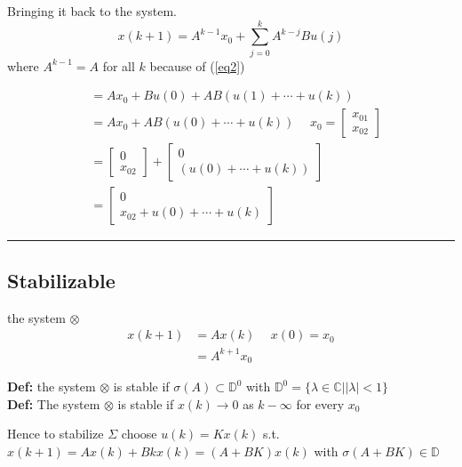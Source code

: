 \documentclass[a4paper]{article}
\begin{document}
Bringing it back to the system.
\begin{equation}
x(k+1) = A^{k-1} x_0 + \sum_{j=0}^{k}{A^{k-j} B u(j)} 
\end{equation}
where $ A^{k-1} = A$ for all $ k $ because of (\ref{eq2}) 


\begin{align}
 &= A x_0 + B u(0) + A B(u(1) + \cdots + u(k)) \\
 &= A x_0 +  A B(u(0) + \cdots + u(k)) \hspace{15pt} x_0 = \begin{bmatrix}
 x_{01} \\
 x_{02}
 \end{bmatrix}  \\
 &= \begin{bmatrix}
 0 \\
 x_{02}
 \end{bmatrix} + \begin{bmatrix}
 0 \\
 (u(0) + \cdots + u(k))
 \end{bmatrix} \\
 &= \begin{bmatrix}
 0 \\
x_{02}+u(0) + \cdots + u(k)
 \end{bmatrix}  
\end{align}

\vspace{5pt}
\hrule
\vspace{5pt}

\subsection{Stabilizable}

the system $ \otimes $
\begin{align}
	x(k+1) &= A x(k) \hspace{15pt} x(0) = x_0 \\
		   &= A ^{k+1} x_0 
\end{align}

\textbf{Def:} the system  $ \otimes $ is stable if  $ \sigma(A) \subset \mathbb{D}^{0} $ with  $ \mathbb{D}^{0}= \{\lambda \in \mathbb{C} | |\lambda| < 1 \}$ \\

\textbf{Def:} The system $ \otimes $ is stable if  $ x(k) \rightarrow  0$ as $ k- \infty $ for every $ x_0 $ 

Hence to stabilize $ \Sigma $ choose  $ u(k) = K x(k) $ s.t.  $ x(k+1) = A x(k) + B k x(k) = (A + B K) x(k) $ with $ \sigma(A + B K) \in \mathbb{D}$
\end{document}
